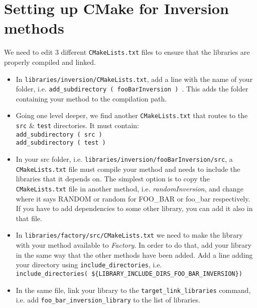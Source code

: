 \documentclass{article}
\begin{document}
\section{Setting up CMake for Inversion methods}
We need to edit 3 different \texttt{CMakeLists.txt} files to ensure that the libraries are properly compiled and linked.
\begin{itemize}
    \item In \texttt{libraries/inversion/CMakeLists.txt}, add a line with the name of your folder, i.e. \texttt{add\_subdirectory ( fooBarInversion ) }. This adds the folder containing your method to the compilation path.
    \item Going one level deeper, we find another \texttt{CMakeLists.txt} that routes to the \texttt{src} \& \texttt{test} directories. It must contain:
    \\
    \texttt{add\_subdirectory ( src ) }
    \\
    \texttt{add\_subdirectory ( test ) }
    \item In your src folder, i.e. \texttt{libraries/inversion/fooBarInversion/src}, a \texttt{CMakeLists.txt} file must compile your method and needs to include the libraries that it depends on. The simplest option is to copy the \texttt{CMakeLists.txt} file in another method, i.e. \textit{randomInversion}, and change where it says RANDOM or random for FOO\_BAR or foo\_bar respectively. If you have to add dependencies to some other library, you can add it also in that file.
    \item In \texttt{libraries/factory/src/CMakeLists.txt} we need to make the library with your method available to \textit{Factory}. In order to do that, add your library in the same way that the other methods have been added. Add a line adding your directory using \texttt{include\_directories}, i.e.\\\texttt{include\_directories( \$\{LIBRARY\_INCLUDE\_DIRS\_FOO\_BAR\_INVERSION\})}
    \item In the same file, link your library to the \texttt{target\_link\_libraries} command, i.e. add \texttt{foo\_bar\_inversion\_library} to the list of libraries.
\end{itemize}
\end{document}
